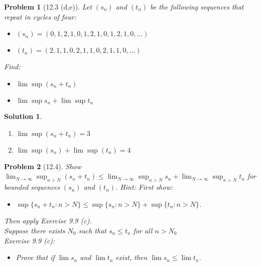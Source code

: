\documentclass[12pt]{article}
\newtheorem{problem}{Problem}
\newtheorem{solution}{Solution}
\begin{document}
\begin{problem}[12.3 (d,e)]
Let $(s_n)$ and $(t_n)$ be the following sequences that repeat in cycles of four:
\begin{itemize}
    \item $(s_n)=(0,1,2,1,0,1,2,1,0,1,2,1,0,\dots)$ 
        \item $(t_n)=(2,1,1,0,2,1,1,0,2,1,1,0,\dots)$  
    \end{itemize}
Find:
\begin{itemize}
    \item $\lim \sup (s_n+t_n)$ 
    \item $\lim \sup s_n + \lim \sup t_n$
\end{itemize}
\end{problem}

\begin{solution}
\begin{enumerate}
    \item $\lim \sup (s_{n} + t_{n}) = 3$
    \item $\lim \sup (s_{n} )+\lim \sup (t_{n} )=4$  
\end{enumerate}    
\end{solution}

\begin{problem}[12.4]   
    Show $\lim_{N \to \infty} \sup_{n>N}(s_{n} +t_n)\leq \lim_{N \to \infty} \sup_{n>N}s_n+\lim_{N \to \infty} \sup_{n>N} t_n$ for bounded sequences $(s_n)$ and $(t_n)$. Hint: First show:
    \begin{itemize}
        \item $\sup\{s_{n} +t_{n} : n> N\}\leq \sup\{s_{n} :n>N\}+\sup \{t_{n} :n>N\}$. 
    \end{itemize}
    Then apply Exercise 9.9 (c).\\
    Suppose there exists $N_0$ such that $s_{n} \leq t_{n} $ for all $n>N_0$\\
    Exercise 9.9 (c):
    \begin{itemize}
        \item Prove that if $\lim s_{n} $ and $\lim t_{n} $ exist, then $\lim s_n\leq \lim t_n$.   
    \end{itemize}
\end{problem}
\end{document}
